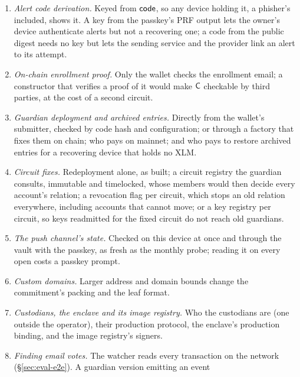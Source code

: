 \begin{enumerate}
    approval. The mail exchanger in the enclave could reply to each
    DKIM-verified approval's sender that a request to send it is a scam,
    without a new party; with \texttt{To:} bound to the recovery address
    where a provider signs it (not at Outlook), the attacker could not have
    the email sent elsewhere to skip the reply. Neither is decided.
  \item \emph{Alert code derivation.} Keyed from $\mathsf{code}$, so any device
    holding it, a phisher's included, shows it. A key from the passkey's PRF
    output lets the owner's device authenticate alerts but not a recovering
    one; a code from the public digest needs no key but lets the sending
    service and the provider link an alert to its attempt.
  \item \emph{On-chain enrollment proof.} Only the wallet checks the
    enrollment email; a constructor that verifies a proof of it would make
    $\mathsf{C}$ checkable by third parties, at the cost of a second circuit.
  \item \emph{Guardian deployment and archived entries.} Directly from the
    wallet's submitter, checked by code hash and configuration; or through a
    factory that fixes them on chain; who pays on mainnet; and who pays to
    restore archived entries for a recovering device that holds no XLM.
  \item \emph{Circuit fixes.} Redeployment alone, as built; a circuit
    registry the guardian consults, immutable and timelocked, whose members
    would then decide every account's relation; a revocation flag per
    circuit, which stops an old relation everywhere, including accounts that
    cannot move; or a key registry per circuit, so keys readmitted for the
    fixed circuit do not reach old guardians.
  \item \emph{The push channel's state.} Checked on this device at once and
    through the vault with the passkey, as fresh as the monthly probe; reading
    it on every open costs a passkey prompt.
  \item \emph{Custom domains.} Larger address and domain bounds change the
    commitment's packing and the leaf format.
  \item \emph{Custodians, the enclave and its image registry.} Who the
    custodians are (one outside the operator), their production protocol,
    the enclave's production binding, and the image registry's signers.
  \item \emph{Finding email votes.} The watcher reads every transaction on
    the network (\S\ref{sec:eval-e2e}). A guardian version emitting an event

\end{enumerate}
